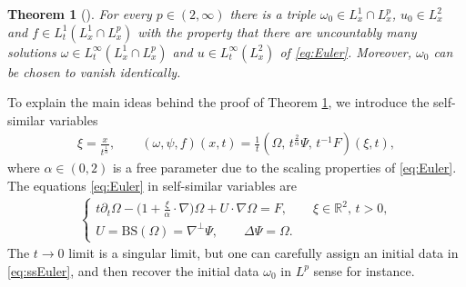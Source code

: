 \documentclass[11pt,reqno]{amsproc}
\def\de{{\partial}}
\def\RR {\mathbb{R}}
\newtheorem{theorem}[proposition]{Theorem}
\theoremstyle{definition}
\theoremstyle{definition}
\numberwithin{equation}{section}
\begin{document}
\begin{theorem}[\cite{vishik_notes}]
\label{th:vishik}
For every $p\in(2,\infty)$ there is a triple $\omega_0\in L^1_x\cap L^p_x$, $u_0\in L^2_x$ and $f\in L^1_t(L^1_x\cap L^p_x)$ with the property that there are uncountably many solutions $\omega\in L^\infty_t(L^1_x\cap L^p_x)$ and $u\in L^\infty_t(L^2_x)$ of \cref{eq:Euler}. Moreover, $\omega_0$ can be chosen to vanish identically.
\end{theorem}
To explain the main ideas behind the proof of Theorem \ref{th:vishik}, we  introduce the self-similar variables 
\begin{align}
\xi=\frac{x}{t^{\frac{1}{\alpha}}}, \qquad (\omega,\psi,f)(x,t)=\frac{1}{t}(\Omega,\, t^{\frac{2}{\alpha}}\Psi,\, t^{-1}F)(\xi,t),
\end{align}
where $\alpha \in (0,2)$ is a free parameter due to the scaling properties of \cref{eq:Euler}.
The equations \cref{eq:Euler} in self-similar variables are
\begin{align}
\label{eq:ssEuler}
\begin{cases}\displaystyle t\de_t\Omega -\big(1+\frac{\xi}{\alpha}\cdot \nabla\big)\Omega+U \cdot \nabla \Omega=F, \qquad \xi \in \RR^2, \, t>0,\\
U=\mathrm{BS}(\Omega)=\nabla^\perp \Psi, \qquad 
\Delta \Psi=\Omega.
\end{cases}
\end{align}
The $t\to0$ limit is a singular limit, but one can carefully assign  an initial data in \cref{eq:ssEuler}, and then recover the initial data $\omega_0$ in $L^{p}$ sense for instance. 
\end{document}
